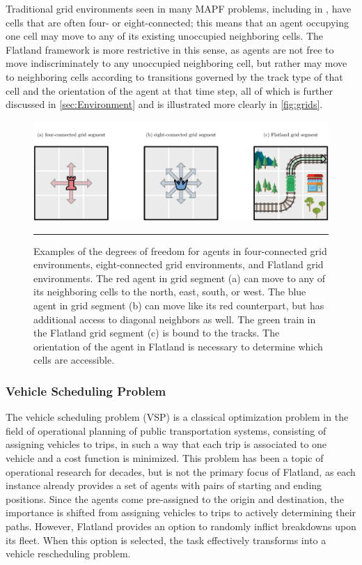 \documentclass[11pt]{article}
\begin{document}
Traditional grid environments seen in many MAPF problems, including in \citep{standley10a}, have cells that are often four- or eight-connected; this means that an agent occupying one cell may move to any of its existing unoccupied neighboring cells.  The Flatland framework is more restrictive in this sense, as agents are not free to move indiscriminately to any unoccupied neighboring cell, but rather may move to neighboring cells according to transitions governed by the track type of that cell and the orientation of the agent at that time step, all of which is further discussed in \autoref{sec:Environment} and is illustrated more clearly in \autoref{fig:grids}.

\begin{figure}[t]
\centering
\includegraphics[width=\textwidth]{chess2}
\caption{Examples of the degrees of freedom for agents in four-connected grid environments, eight-connected grid environments, and Flatland grid environments. The red agent in grid segment (a) can move to any of its neighboring cells to the north, east, south, or west.  The blue agent in grid segment (b) can move like its red counterpart, but has additional access to diagonal neighbors as well.  The green train in the Flatland grid segment (c) is bound to the tracks.  The orientation of the agent in Flatland is necessary to determine which cells are accessible. }
\label{fig:grids}

\begin{center}
{\color{lightgray} \rule{\linewidth}{0.15mm}}
\end{center}

\end{figure}

\subsubsection{Vehicle Scheduling Problem}
The vehicle scheduling problem (VSP) \citep{bapeukfa00a} is a classical optimization problem in the field of operational planning of public transportation systems, consisting of assigning vehicles to trips, in such a way that each trip is associated to one vehicle and a cost function is minimized.  This problem has been a topic of operational research for decades, but is not the primary focus of Flatland, as each instance already provides a set of agents with pairs of starting and ending positions. Since the agents come pre-assigned to the origin and destination, the importance is shifted from assigning vehicles to trips to actively determining their paths.  However, Flatland provides an option to randomly inflict breakdowns upon its fleet.  When this option is selected, the task effectively transforms into a vehicle rescheduling problem.
\end{document}
